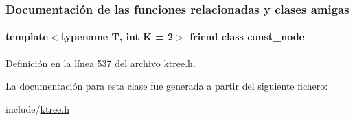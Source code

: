 \subsubsection{Documentación de las funciones relacionadas y clases amigas}
\paragraph[{\texorpdfstring{const\+\_\+node}{const_node}}]{\setlength{\rightskip}{0pt plus 5cm}template$<$typename T, int K = 2$>$ friend class {\bf const\+\_\+node}\hspace{0.3cm}{\ttfamily [friend]}}\hypertarget{classktree_1_1const__node_1_1child__iterator_a220f2e00de7b237254f2e2ba9dc0b635}{}\label{classktree_1_1const__node_1_1child__iterator_a220f2e00de7b237254f2e2ba9dc0b635}


Definición en la línea 537 del archivo ktree.\+h.



La documentación para esta clase fue generada a partir del siguiente fichero\+:\begin{DoxyCompactItemize}
\item 
include/\hyperlink{ktree_8h}{ktree.\+h}\end{DoxyCompactItemize}
